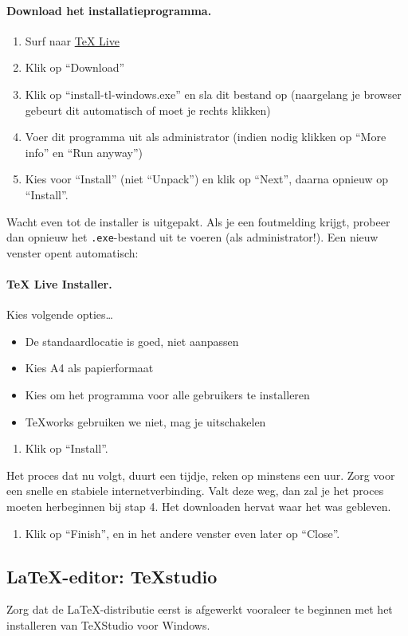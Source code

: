 \documentclass[kulak]{kulakarticle} %
\begin{document}
\paragraph{Download het installatieprogramma.}
\begin{enumerate}
\item Surf naar \href{http://www.tug.org/texlive/}{TeX Live}
\item Klik op ``Download''
\item Klik op ``install-tl-windows.exe'' en sla dit bestand op (naargelang je browser gebeurt dit automatisch of moet je rechts klikken)
\item Voer dit programma uit als administrator (indien nodig klikken op ``More info'' en ``Run anyway'')
\item Kies voor ``Install'' (niet ``Unpack'') en klik op ``Next'', daarna opnieuw op ``Install''.
\end{enumerate}
Wacht even tot de installer is uitgepakt. Als je een foutmelding krijgt, probeer dan opnieuw het \texttt{.exe}-bestand uit te voeren (als administrator!). Een nieuw venster  opent automatisch: 
\paragraph{TeX Live Installer.} Kies volgende opties\ldots
\begin{itemize}
\item De standaardlocatie is goed, niet aanpassen
\item Kies A4 als papierformaat
\item Kies om het programma voor alle gebruikers te installeren
\item TeXworks gebruiken we niet, mag je uitschakelen
\end{itemize}
\begin{enumerate}[resume]
\item Klik op ``Install''.
\end{enumerate}
Het proces dat nu volgt, duurt een tijdje, reken op minstens een uur. Zorg voor een snelle en stabiele internetverbinding. Valt deze weg, dan zal je het proces moeten herbeginnen bij stap 4. Het downloaden hervat waar het was gebleven.
\begin{enumerate}[resume]
\item Klik op ``Finish'', en in het andere venster even later op ``Close''.
\end{enumerate}

\subsection{\LaTeX-editor: TeXstudio}
Zorg dat de \LaTeX-distributie eerst is afgewerkt vooraleer te beginnen met het installeren van TeXStudio voor Windows.
\end{document}
